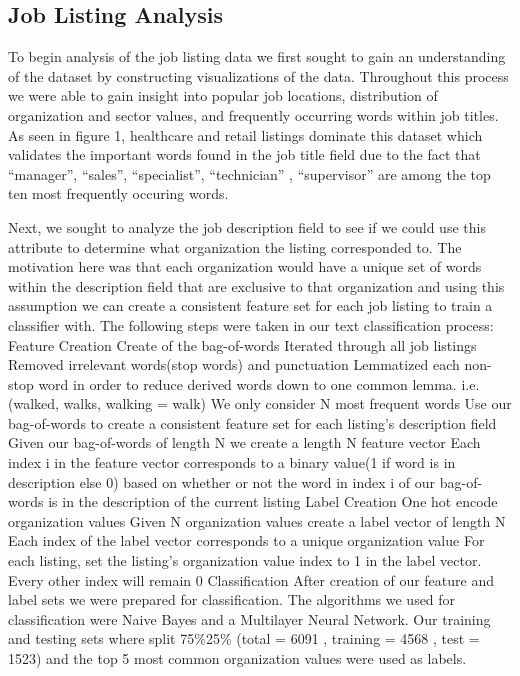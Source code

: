\subsection{Job Listing Analysis}
To begin analysis of the job listing data we first sought to gain an understanding of the dataset by constructing visualizations of the data. Throughout this process we were able to gain insight into popular job locations, distribution of organization and sector values, and frequently occurring words within job titles.  As seen in figure 1, healthcare and retail listings dominate this dataset which validates the important words found in the job title field due to the fact that “manager”, “sales”, “specialist”, “technician” , “supervisor” are among the top ten most frequently occuring words. 

Next, we sought to analyze the job description field to see if we could use this attribute to determine what organization the listing corresponded to. The motivation here was that each organization would have a unique set of words within the description field that are exclusive to that organization and using this assumption we can create a consistent feature set for each job listing to train a classifier with. The following steps were taken in our text classification process:
Feature Creation
Create of the bag-of-words 
Iterated through all job listings
Removed irrelevant words(stop words) and  punctuation
Lemmatized each non-stop word in order to reduce derived words down to one common lemma. i.e.(walked, walks, walking = walk)
We only consider N most frequent words 
Use our bag-of-words to create a consistent feature set for each listing’s description field
Given our bag-of-words of length N we create a length N feature vector
Each index i  in the feature vector corresponds to a binary value(1 if word is in description else 0) based on whether or not the word in index i of our bag-of-words is in the description of the current listing
Label Creation
One hot encode organization values
Given N organization values create a label vector of length N 
Each index of the label vector corresponds to a unique organization value 
For each listing, set the listing’s organization value index to 1 in the label vector. Every other index will remain 0
Classification
After creation of our feature and label sets we were prepared for classification. The algorithms we used for classification were Naive Bayes and a Multilayer Neural Network. Our training and testing sets where split 75\%25\% (total = 6091 , training = 4568 , test = 1523) and  the top 5 most common organization values were used as labels.  
